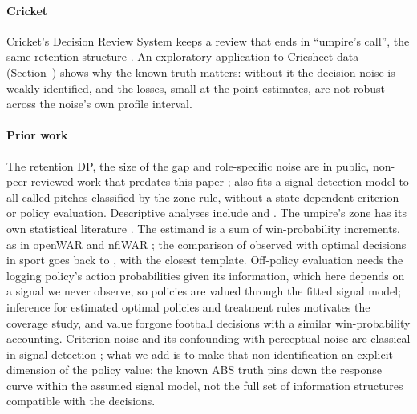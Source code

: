 \documentclass[aoas]{imsart}
\theoremstyle{plain}
\theoremstyle{definition}
\begin{document}
\paragraph{Cricket} Cricket's Decision Review System keeps a review that ends in ``umpire's call'', the same
retention structure \citep{Shivakumar2018}. An exploratory application to Cricsheet data \citep{Cricsheet}
(Section~) shows why the known truth matters: without it the decision noise is weakly identified, and the
losses, small at the point estimates, are not robust across the noise's own profile interval.

\paragraph{Prior work} The retention DP, the size of the gap and role-specific noise are in public, non-peer-reviewed
work that predates this paper \citep{Arora2026use,Namuduri2026runs,Kirby2026economy,Hires2026sdt,Tango2026naive};
\citet{Hires2026sdt} also fits a signal-detection model to all called pitches classified by the zone rule, without a
state-dependent criterion or policy evaluation. Descriptive analyses include \citet{LeeEtAl2026abs} and
\citet{Baumann2026money}. The umpire's zone has its own statistical literature
\citep{ZimmermanEtAl2019,DeshpandeWyner2017,Mills2017}. The estimand is a sum of win-probability increments, as in
openWAR and nflWAR \citep{BaumerEtAl2015,YurkoEtAl2019}; the comparison of observed with optimal decisions in sport goes
back to \citet{Romer2006}, with \citet{SandholtzEtAl2024} the closest template. Off-policy evaluation
\citep{ThomasBrunskill2016,KallusUehara2020} needs the logging policy's action probabilities given its information,
which here depends on a signal we never observe, so policies are valued through the fitted signal model; inference for estimated optimal policies and treatment rules
\citep{HiranoPorter2009,LaberEtAl2014,LuedtkeVanDerLaan2016,AndrewsEtAl2024} motivates the coverage study, and
\citet{YamLopez2019} value forgone football decisions with a similar win-probability accounting. Criterion noise and
its confounding with perceptual noise are classical in signal detection
\citep{GreenSwets1966,BenjaminEtAl2009,MuellerWeidemann2008}; what we add is to make that non-identification an
explicit dimension of the policy value; the known ABS truth pins down the response curve within the assumed
signal model, not the full set of information structures compatible with the decisions.

\end{document}
